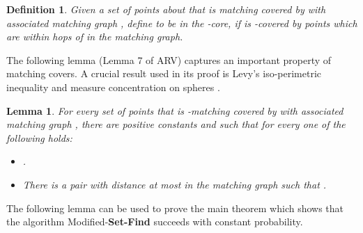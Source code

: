 \documentclass [11pt,a4paper]{article}
\newtheorem{lemma}{Lemma}
\newtheorem{definition}{Definition}
\begin{document}
\begin{definition}
Given a set of  points about that is  matching covered by  with 
associated matching graph , define  to be in the -core,  if  is -covered
by points which are within  hops of  in the matching graph.
\end{definition}

The following lemma (Lemma 7 of {\sf ARV}) captures an important property of matching covers.
A crucial result used in its proof is Levy's iso-perimetric inequality and measure concentration
on spheres \cite{B97, Mat02}.

\begin{lemma}\label{metric-lemma}
For every set of  points that is -matching covered by  with associated 
matching graph , there are positive constants  and  such that for 
every  one of the following holds: 
\begin{itemize}
\item[1.] .
\item[2.] There is a pair with distance at most  in the matching graph  such that .
\end{itemize}
\end{lemma}

The following lemma can be used to prove the main theorem which shows that the algorithm
{\sc Modified}-\textbf{Set-Find} succeeds with constant probability. 
\end{document}
